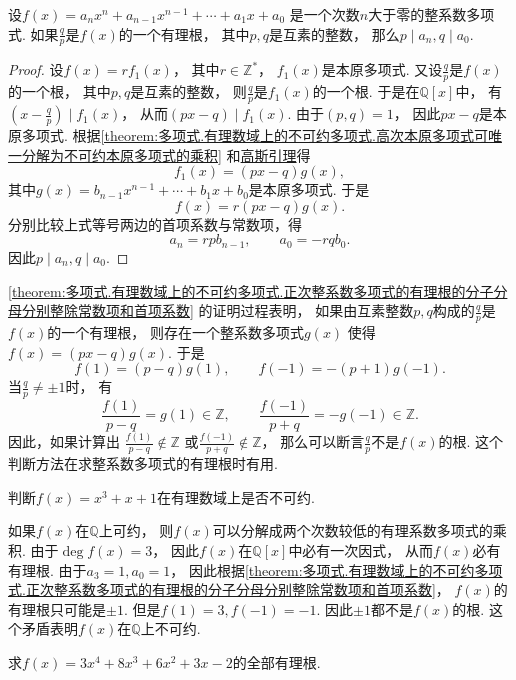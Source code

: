 \begin{theorem}\label{theorem:多项式.有理数域上的不可约多项式.正次整系数多项式的有理根的分子分母分别整除常数项和首项系数}
设\(f(x)=a_n x^n+a_{n-1} x^{n-1}+\dotsb+a_1 x+a_0\)
是一个次数\(n\)大于零的整系数多项式.
如果\(\frac{q}{p}\)是\(f(x)\)的一个有理根，
其中\(p,q\)是互素的整数，
那么\(p \mid a_n,
q \mid a_0\).
\begin{proof}
设\(f(x)=r f_1(x)\)，
其中\(r\in\mathbb{Z}^*\)，
\(f_1(x)\)是本原多项式.
又设\(\frac{q}{p}\)是\(f(x)\)的一个根，
其中\(p,q\)是互素的整数，
则\(\frac{q}{p}\)是\(f_1(x)\)的一个根.
于是在\(\mathbb{Q}[x]\)中，
有\(\left(x-\frac{q}{p}\right) \mid f_1(x)\)，
从而\((px-q) \mid f_1(x)\).
由于\((p,q)=1\)，
因此\(px-q\)是本原多项式.
根据\cref{theorem:多项式.有理数域上的不可约多项式.高次本原多项式可唯一分解为不可约本原多项式的乘积}
和\hyperref[theorem:多项式.有理数域上的不可约多项式.引理2]{高斯引理}得\[
	f_1(x)=(px-q) g(x),
\]
其中\(g(x)=b_{n-1} x^{n-1}+\dotsb+b_1 x+b_0\)是本原多项式.
于是\[
	f(x)=r(px-q) g(x).
\]
分别比较上式等号两边的首项系数与常数项，得\[
	a_n = r p b_{n-1}, \qquad
	a_0 = -r q b_0.
\]
因此\(p \mid a_n,
q \mid a_0\).
\end{proof}
\end{theorem}

\cref{theorem:多项式.有理数域上的不可约多项式.正次整系数多项式的有理根的分子分母分别整除常数项和首项系数}
的证明过程表明，
如果由互素整数\(p,q\)构成的\(\frac{q}{p}\)是\(f(x)\)的一个有理根，
则存在一个整系数多项式\(g(x)\)
使得\(f(x)=(px-q) g(x)\).
于是\[
	f(1)=(p-q) g(1), \qquad
	f(-1)=-(p+1) g(-1).
\]
当\(\frac{q}{p}\neq\pm1\)时，
有\[
	\frac{f(1)}{p-q}=g(1)\in\mathbb{Z}, \qquad
	\frac{f(-1)}{p+q}=-g(-1)\in\mathbb{Z}.
\]
因此，如果计算出
\(\frac{f(1)}{p-q}\notin\mathbb{Z}\)
或\(\frac{f(-1)}{p+q}\notin\mathbb{Z}\)，
那么可以断言\(\frac{q}{p}\)不是\(f(x)\)的根.
这个判断方法在求整系数多项式的有理根时有用.

\begin{example}
判断\(f(x)=x^3+x+1\)在有理数域上是否不可约.
\begin{solution}
如果\(f(x)\)在\(\mathbb{Q}\)上可约，
则\(f(x)\)可以分解成两个次数较低的有理系数多项式的乘积.
由于\(\deg f(x)=3\)，
因此\(f(x)\)在\(\mathbb{Q}[x]\)中必有一次因式，
从而\(f(x)\)必有有理根.
由于\(a_3=1,a_0=1\)，
因此根据\cref{theorem:多项式.有理数域上的不可约多项式.正次整系数多项式的有理根的分子分母分别整除常数项和首项系数}，
\(f(x)\)的有理根只可能是\(\pm1\).
但是\(f(1)=3,
f(-1)=-1\).
因此\(\pm1\)都不是\(f(x)\)的根.
这个矛盾表明\(f(x)\)在\(\mathbb{Q}\)上不可约.
\end{solution}
\end{example}

\begin{example}
求\(f(x)=3x^4+8x^3+6x^2+3x-2\)的全部有理根.
\end{example}
